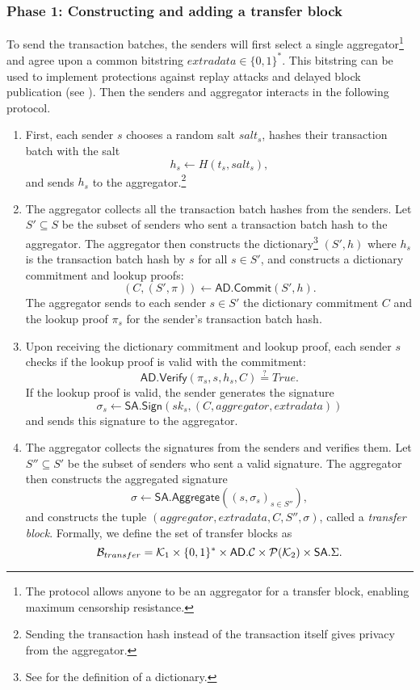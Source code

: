 \subsubsection{Phase 1: Constructing and adding a transfer block}\label{section:transferring-phase-1}

To send the transaction batches, the senders will first select a single aggregator\footnote{The protocol allows anyone to be an aggregator for a transfer block, enabling maximum censorship resistance.} and agree upon a common bitstring \(extradata \in \{0,1\}^*\). This bitstring can be used to implement protections against replay attacks and delayed block publication (see ). Then the senders and aggregator interacts in the following protocol.

\begin{enumerate}
  \item First, each sender \(s\) chooses a random salt \(salt_s\), hashes their transaction batch with the salt \[h_s \leftarrow H(t_s,salt_s),\] and sends \(h_s\) to the aggregator.\footnote{Sending the transaction hash instead of the transaction itself gives privacy from the aggregator.}
  \item The aggregator collects all the transaction batch hashes from the senders. Let \(S' \subseteq S\) be the subset of senders who sent a transaction batch hash to the aggregator. The aggregator then constructs the dictionary\footnote{See  for the definition of a dictionary.} \((S',h)\) where \(h_s\) is the transaction batch hash by \(s\) for all \(s \in S'\), and constructs a dictionary commitment and lookup proofs: \[(C, (S',\pi)) \leftarrow \mathsf{AD.Commit}(S',h).\] The aggregator sends to each sender \(s \in S'\) the dictionary commitment \(C\) and the lookup proof \(\pi_s\) for the sender's transaction batch hash.
  \item Upon receiving the dictionary commitment and lookup proof, each sender \(s\) checks if the lookup proof is valid with the commitment: \[\mathsf{AD.Verify}(\pi_s,s,h_s,C) \stackrel{?}{=} True.\] If the lookup proof is valid, the sender generates the signature \[\sigma_s \leftarrow \mathsf{SA.Sign}(sk_s,(C,aggregator,extradata))\] and sends this signature to the aggregator.
  \item The aggregator collects the signatures from the senders and verifies them. Let \(S'' \subseteq S'\) be the subset of senders who sent a valid signature. The aggregator then constructs the aggregated signature \[\sigma \leftarrow \mathsf{SA.Aggregate}((s,\sigma_s)_{s \in S''}),\] and constructs the tuple \((aggregator,extradata,C,S'',\sigma)\), called a \emph{transfer block}. Formally, we define the set of transfer blocks \href{https://github.com/\repo FVIntmax/Block.lean#L25}{\ExternalLink}as \[\mathcal{B}_{transfer} = \mathcal{K}_1 \times \{0,1\}^* \times \mathsf{AD}.\mathcal{C} \times \mathcal{P}(\mathcal{K}_2) \times \mathsf{SA}.\Sigma.\]

\end{enumerate}
